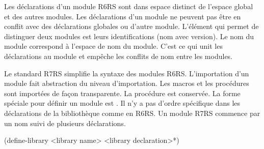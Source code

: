 Les déclarations d'un module R6RS sont dans espace distinct de l'espace global et
des autres modules. Les déclarations d'un module ne peuvent pas être en conflit avec
des déclarations globales ou d'autre module. L'élément qui permet de distinguer deux modules
est leurs identifications (nom avec version). Le nom du module correspond à l'espace de nom du module.
C'est ce qui unit les déclarations au module et empêche les conflits de nom entre
les modules.







Le standard R7RS\cite{Scheme:R7RS} simplifie la syntaxe des modules
R6RS\cite{Scheme:R6RS}.  L'importation d'un module fait abstraction du niveau
d'importation. Les macros et les procédures sont importées de façon
transparente. La procédure  est conservée. La forme spéciale pour
définir un module est . Il n'y a pas d'ordre spécifique
dans les déclarations de la bibliothèque comme en R6RS. Un module R7RS commence par
un nom suivi de plusieurs déclarations.\\
\begin{center}
  \begin{mplisting}{0.5}
(define-library <library name>
  <library declaration>*)
\end{mplisting}
\end{center}

